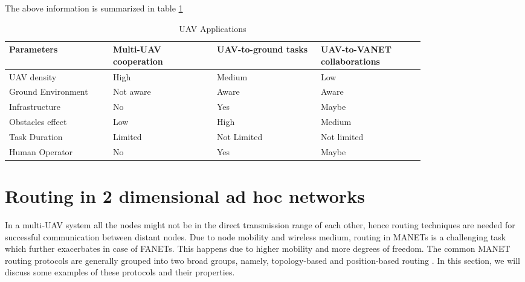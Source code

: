 The above information is summarized in table \ref{tab:uav_applications}

\begin{table}
\caption{UAV Applications}
\label{tab:uav_applications}
\begin{tabular}{|p{0.2\linewidth}|p{0.2\linewidth}|p{0.2\linewidth}|p{0.2\linewidth}|}
\toprule
Parameters & Multi-UAV cooperation & UAV-to-ground tasks & UAV-to-VANET collaborations\\
\midrule
UAV density & High & Medium & Low\\
\midrule
Ground Environment 	& Not aware &  Aware & Aware  \\
\midrule
Infrastructure & No & Yes &  Maybe \\
\midrule
Obstacles effect & Low & High & Medium \\
\midrule
Task Duration & Limited & Not Limited & Not limited \\
\midrule
Human Operator & No & Yes & Maybe \\
\bottomrule
\end{tabular}
\end{table}

\section{Routing in 2 dimensional ad hoc networks}

In a multi-UAV system all the nodes might not be in the direct transmission range of each other, hence routing techniques are needed for successful communication between distant nodes. Due to node mobility and wireless medium, routing in MANETs is a challenging task which further exacerbates in case of FANETs. This happens due to higher mobility and more degrees of freedom. 
The common MANET routing protocols are generally grouped into two broad groups, namely, topology-based and position-based routing \cite{6238283}. In this section, we will discuss some examples of these protocols and their properties.

